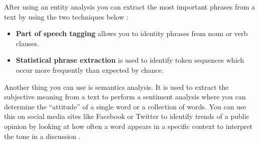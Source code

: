 \noindent
After using an entity analysis you can extract the most important phrases from a text by using the two techniques below \cite{NelsonNaturalTechnologies}:

\begin{itemize}
    \item \textbf{Part of speech tagging} allows you to identity phrases from noun or verb clauses.
    \item \textbf{Statistical phrase extraction} is used to identify token sequences which occur more frequently than expected by chance.
\end{itemize}

\noindent
Another thing you can use is semantics analysis. It is used to extract the subjective meaning from a text to perform a sentiment analysis where you can determine the \enquote{attitude} of a single word or a collection of words. You can use this on social media sites like Facebook or Twitter to identify trends of a public opinion by looking at how often a word appears in a specific context to interpret the tone in a discussion \cite{Plapinger2017AScience}.

